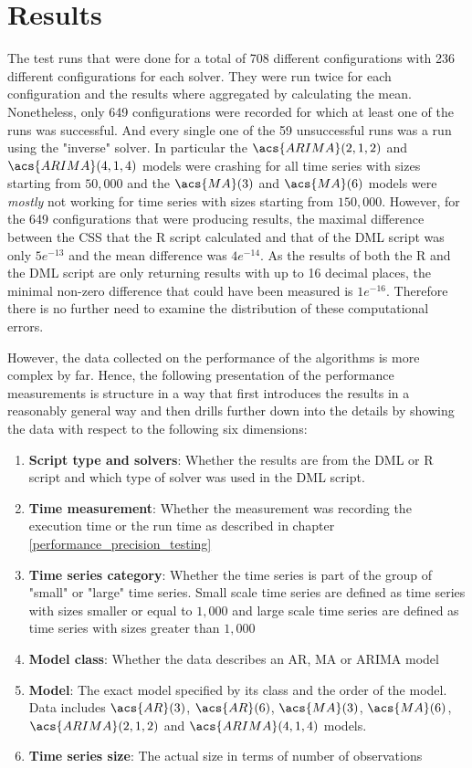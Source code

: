 \chapter{Results}\label{results}

The test runs that were done for a total of 708 different configurations with 236 different configurations for each solver. They were run twice for each configuration and the results where aggregated by calculating the mean. Nonetheless, only 649 configurations were recorded for which at least one of the runs was successful. And every single one of the 59 unsuccessful runs was a run using the "inverse" solver. In particular the $\acs{ARIMA}(2,1,2)$ and  $\acs{ARIMA}(4,1,4)$ models were crashing for all time series with sizes starting from $50,000$ and the $\acs{MA}(3)$ and $\acs{MA}(6)$ models were \textit{mostly} not working for time series with sizes starting from $150,000$. However, for the 649 configurations that were producing results, the maximal difference between the \acl{CSS} that the R script calculated and that of the \acs{DML} script was only $5e^{-13}$ and the mean difference was $4e^{-14}$. As the results of both the R and the \acs{DML} script are only returning results with up to 16 decimal places, the minimal non-zero difference that could have been measured is $1e^{-16}$. Therefore there is no further need to examine the distribution of these computational errors.

However, the data collected on the performance of the algorithms is more complex by far. Hence, the following presentation of the performance measurements is structure in a way that first introduces the results in a reasonably general way and then drills further down into the details by showing the data with respect to the following six dimensions:
\begin{enumerate}
    \item \textbf{Script type and solvers}: Whether the results are from the \acs{DML} or R script and which type of solver was used in the \acs{DML} script.
    \item \textbf{Time measurement}: Whether the measurement was recording the execution time or the run time as described in chapter \ref{performance_precision_testing}
    \item \textbf{Time series category}: Whether the time series is part of the group of "small" or "large" time series. Small scale time series are defined as time series with sizes smaller or equal to $1,000$ and large scale time series are defined as time series with sizes greater than $1,000$
    \item \textbf{Model class}: Whether the data describes an \acs{AR}, \acs{MA} or \acs{ARIMA} model
    \item \textbf{Model}: The exact model specified by its class and the order of the model. Data includes $\acs{AR}(3)$, $\acs{AR}(6)$, $\acs{MA}(3)$, $\acs{MA}(6)$, $\acs{ARIMA}(2,1,2)$ and $\acs{ARIMA}(4,1,4)$ models.
    \item \textbf{Time series size}: The actual size in terms of number of observations
\end{enumerate}

